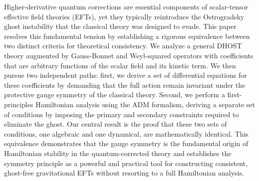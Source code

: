 \documentclass[twocolumn]{aastex631}
\begin{document}
Higher-derivative quantum corrections are essential components of scalar-tensor effective field theories (EFTs), yet they typically reintroduce the Ostrogradsky ghost instability that the classical theory was designed to evade. This paper resolves this fundamental tension by establishing a rigorous equivalence between two distinct criteria for theoretical consistency. We analyze a general DHOST theory augmented by Gauss-Bonnet and Weyl-squared operators with coefficients that are arbitrary functions of the scalar field and its kinetic term. We then pursue two independent paths: first, we derive a set of differential equations for these coefficients by demanding that the full action remain invariant under the protective gauge symmetry of the classical theory. Second, we perform a first-principles Hamiltonian analysis using the ADM formalism, deriving a separate set of conditions by imposing the primary and secondary constraints required to eliminate the ghost. Our central result is the proof that these two sets of conditions, one algebraic and one dynamical, are mathematically identical. This equivalence demonstrates that the gauge symmetry is the fundamental origin of Hamiltonian stability in the quantum-corrected theory and establishes the symmetry principle as a powerful and practical tool for constructing consistent, ghost-free gravitational EFTs without resorting to a full Hamiltonian analysis.
\end{document}
